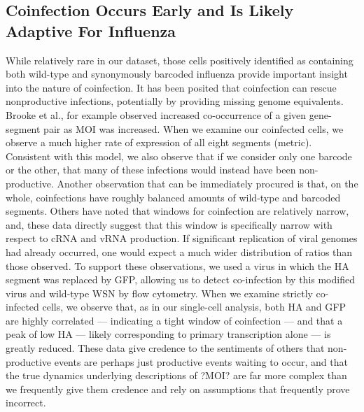 \documentclass[9pt,lineno]{elife}
\begin{document}
\subsection{Coinfection Occurs Early and Is Likely Adaptive For Influenza}
	While relatively rare in our dataset, those cells positively identified as containing both wild-type and synonymously barcoded influenza provide important insight into the nature of coinfection. It has been posited that coinfection can rescue nonproductive infections, potentially by providing missing genome equivalents. Brooke et al., for example observed increased co-occurrence of a given gene-segment pair as MOI was increased. When we examine our coinfected cells, we observe a much higher rate of expression of all eight segments (metric). Consistent with this model, we also observe that if we consider only one barcode or the other, that many of these infections would instead have been non-productive. Another observation that can be immediately procured is that, on the whole, coinfections have roughly balanced amounts of wild-type and barcoded segments. Others have noted that windows for coinfection are relatively narrow, and, these data directly suggest that this window is specifically narrow with respect to cRNA and vRNA production. If significant replication of viral genomes had already occurred, one would expect a much wider distribution of ratios than those observed. To support these observations, we used a virus in which the HA segment was replaced by GFP, allowing us to detect co-infection by this modified virus and wild-type WSN by flow cytometry. When we examine strictly co-infected cells, we observe that, as in our single-cell analysis, both HA and GFP are highly correlated --- indicating a tight window of coinfection --- and that a peak of low HA --- likely corresponding to primary transcription alone --- is greatly reduced. These data give credence to the sentiments of others that non-productive events are perhaps just productive events waiting to occur, and that the true dynamics underlying descriptions of ?MOI? are far more complex than we frequently give them credence and rely on assumptions that frequently prove incorrect. 
\end{document}
